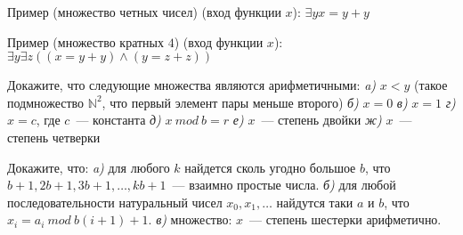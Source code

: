 Пример (множество четных чисел) (вход функции $x$): 
$\exists y x = y + y$

Пример (множество кратных $4$) (вход функции $x$): 
$\exists y \exists z ((x = y + y) \land (y = z + z))$


\begin{task}
    Докажите, что следующие множества являются арифметичными:
    {\it a)} $x < y$ (такое подмножество $\mathbb{N}^2$, что первый элемент пары
	    меньше второго)
    {\it б)} $x = 0$
    {\it в)} $x = 1$
    {\it г)} $x = c$, где $c$~--- константа
    {\it д)} $x~mod~b = r$
    {\it е)} $x$~--- степень двойки
    {\it ж)} $x$~--- степень четверки
\end{task}

\begin{task}
    Докажите, что:
    {\it a)} для любого $k$ найдется сколь угодно большое $b$, что
    $b + 1, 2b + 1, 3b + 1, \dots, kb + 1$~--- взаимно простые числа.
    {\it б)} для любой последовательности натуральный чисел $x_0, x_1,
    \dots$ найдутся таки $a$ и $b$, что $x_i = a_i~ mod ~ b(i + 1) +
    1$.
    {\it в)} множество: $x$~--- степень шестерки арифметично.
\end{task}


